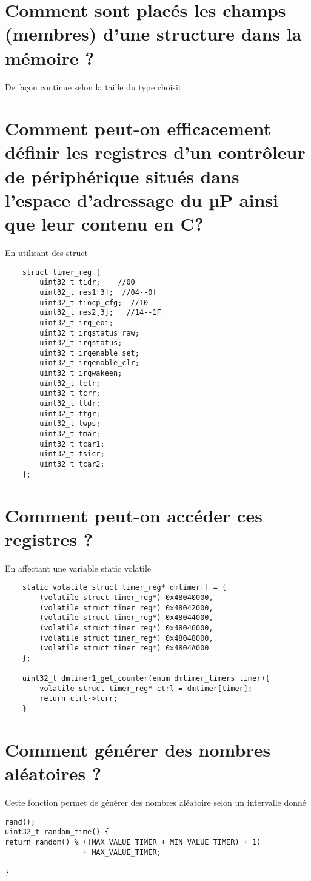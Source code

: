 \section{Comment sont placés les champs (membres) d’une structure dans la mémoire ?}
De façon continue selon la taille du type choisit

\section{Comment peut-on efficacement définir les registres d’un contrôleur de périphérique situés dans l’espace d’adressage du µP ainsi que leur contenu en C?}
En utilisant des struct
\begin{lstlisting}
    struct timer_reg {
        uint32_t tidr;    //00
        uint32_t res1[3];  //04--0f
        uint32_t tiocp_cfg;  //10
        uint32_t res2[3];   //14--1F
        uint32_t irq_eoi;
        uint32_t irqstatus_raw;
        uint32_t irqstatus;
        uint32_t irqenable_set;
        uint32_t irqenable_clr;
        uint32_t irqwakeen;
        uint32_t tclr;
        uint32_t tcrr;
        uint32_t tldr;
        uint32_t ttgr;
        uint32_t twps;
        uint32_t tmar;
        uint32_t tcar1;
        uint32_t tsicr;
        uint32_t tcar2;
    };      
\end{lstlisting}

\section{Comment peut-on accéder ces registres ?}
En affectant une variable static volatile\\

\begin{lstlisting}
    static volatile struct timer_reg* dmtimer[] = {
		(volatile struct timer_reg*) 0x48040000,
		(volatile struct timer_reg*) 0x48042000,
		(volatile struct timer_reg*) 0x48044000,
		(volatile struct timer_reg*) 0x48046000,
		(volatile struct timer_reg*) 0x48048000,
		(volatile struct timer_reg*) 0x4804A000 
    };

    uint32_t dmtimer1_get_counter(enum dmtimer_timers timer){
		volatile struct timer_reg* ctrl = dmtimer[timer];
		return ctrl->tcrr;
    }
\end{lstlisting}

\section{Comment générer des nombres aléatoires ?}
Cette fonction permet de générer des nombres aléatoire selon un intervalle donné
\begin{lstlisting}
rand();
uint32_t random_time() {
return random() % ((MAX_VALUE_TIMER + MIN_VALUE_TIMER) + 1)
                  + MAX_VALUE_TIMER;

}
\end{lstlisting}

